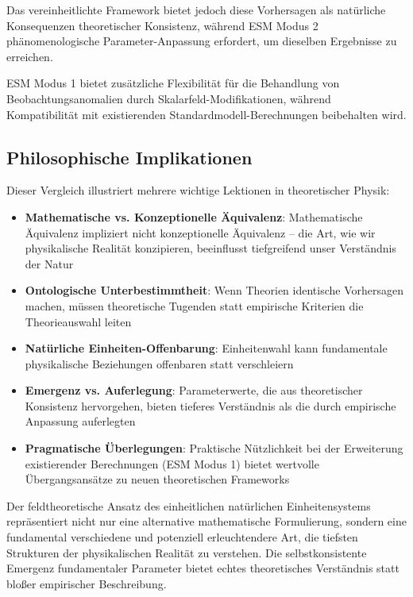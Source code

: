 	Das vereinheitlichte Framework bietet jedoch diese Vorhersagen als natürliche Konsequenzen theoretischer Konsistenz, während ESM Modus 2 phänomenologische Parameter-Anpassung erfordert, um dieselben Ergebnisse zu erreichen.
	
	ESM Modus 1 bietet zusätzliche Flexibilität für die Behandlung von Beobachtungsanomalien durch Skalarfeld-Modifikationen, während Kompatibilität mit existierenden Standardmodell-Berechnungen beibehalten wird.
	
	\subsection{Philosophische Implikationen}
	\label{subsec:philosophical_implications}
	
	Dieser Vergleich illustriert mehrere wichtige Lektionen in theoretischer Physik:
	
	\begin{itemize}
		\item \textbf{Mathematische vs. Konzeptionelle Äquivalenz}: Mathematische Äquivalenz impliziert nicht konzeptionelle Äquivalenz – die Art, wie wir physikalische Realität konzipieren, beeinflusst tiefgreifend unser Verständnis der Natur
		\item \textbf{Ontologische Unterbestimmtheit}: Wenn Theorien identische Vorhersagen machen, müssen theoretische Tugenden statt empirische Kriterien die Theorieauswahl leiten
		\item \textbf{Natürliche Einheiten-Offenbarung}: Einheitenwahl kann fundamentale physikalische Beziehungen offenbaren statt verschleiern
		\item \textbf{Emergenz vs. Auferlegung}: Parameterwerte, die aus theoretischer Konsistenz hervorgehen, bieten tieferes Verständnis als die durch empirische Anpassung auferlegten
		\item \textbf{Pragmatische Überlegungen}: Praktische Nützlichkeit bei der Erweiterung existierender Berechnungen (ESM Modus 1) bietet wertvolle Übergangsansätze zu neuen theoretischen Frameworks
	\end{itemize}
	
	Der feldtheoretische Ansatz des einheitlichen natürlichen Einheitensystems repräsentiert nicht nur eine alternative mathematische Formulierung, sondern eine fundamental verschiedene und potenziell erleuchtendere Art, die tiefsten Strukturen der physikalischen Realität zu verstehen. Die selbstkonsistente Emergenz fundamentaler Parameter bietet echtes theoretisches Verständnis statt bloßer empirischer Beschreibung.
	